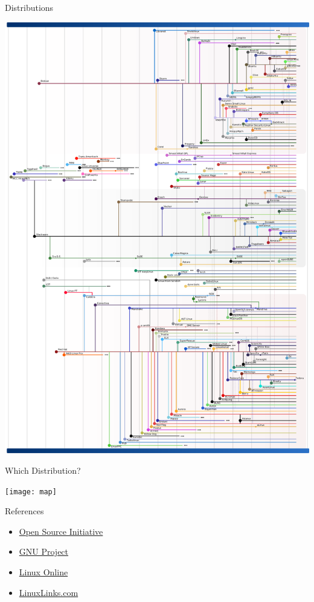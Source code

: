 \begin{frame}{Distributions}
  \begin{center}
    \includegraphics[height=.9\textheight]{Gldt}
  \end{center}
\end{frame}

\begin{frame}{Which Distribution?}
  \begin{center}
    \texttt{[image: map]}
  \end{center}
\end{frame}

\begin{frame}{References}
  \begin{itemize}
  \item \href{http://www.opensource.org/}{Open Source Initiative}
  \item \href{http://www.gnu.org}{GNU Project}
  \item \href{http://www.linux.org/}{Linux Online}
  \item \href{http://www.linuxlinks.com}{LinuxLinks.com}
  \end{itemize}
\end{frame}



